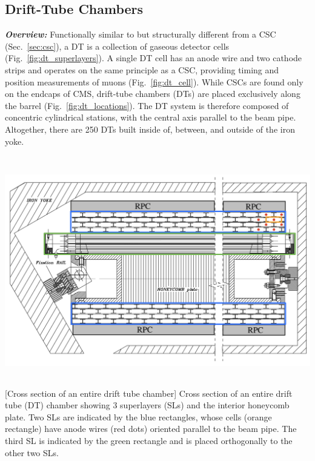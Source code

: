 \subsection{Drift-Tube Chambers}
\label{sec:dt}

\textbf{\textit{Overview:}}
Functionally similar to but structurally different from a CSC (Sec.~\ref{sec:csc}), a DT is a collection of gaseous detector cells (Fig.~\ref{fig:dt_superlayers}).
A single DT cell has an anode wire and two cathode strips and operates on the same principle as a CSC, providing timing and position measurements of muons (Fig.~\ref{fig:dt_cell}).
While CSCs are found only on the endcaps of CMS, drift-tube chambers (DTs) are placed exclusively along the barrel (Fig.~\ref{fig:dt_locations}).
The DT system is therefore composed of concentric cylindrical stations, with the central axis parallel to the beam pipe.
Altogether, there are 250 DTs built inside of, between, and outside of the iron yoke.
\begin{multiFigure}
    \centering
    \includegraphics[width=15cm,height=10cm,keepaspectratio]{figures/cms/muonsys/drifttube_superlayers.jpeg}
        [Cross section of an entire drift tube chamber]
        {Cross section of an entire drift tube (DT) chamber showing 3 superlayers (SLs) and the interior honeycomb plate.
        Two SLs are indicated by the blue rectangles, whose cells (orange rectangle) have anode wires (red dots) oriented parallel to the beam pipe.
        The third SL is indicated by the green rectangle and is placed orthogonally to the other two SLs.}
    \label{fig:dt_superlayers}
\end{multiFigure}

